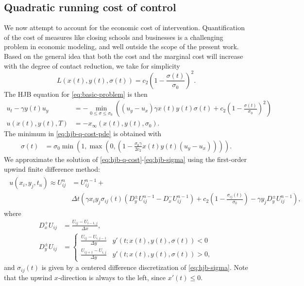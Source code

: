 \documentclass[english,12pt,letter]{article}
\newcommand{\Rnot}{\sigma_0}
\newcommand{\Sinf}{x_\infty}
\newcommand{\Dt}{\Delta t}
\newcommand{\Dx}{\Delta x}
\newcommand{\Dy}{\Delta y}
\begin{document}
\subsection{Quadratic running cost of control}
We now attempt to account for the economic cost of intervention.  Quantification
of the cost of measures like closing schools and businesses is a challenging
problem in economic modeling, and well outside the scope of the present work.
Based on the general idea that both the cost and the marginal cost will increase
with the degree of contact reduction, we take for simplicity
$$
    L(x(t),y(t),\sigma(t)) = c_2 \left(1-\frac{\sigma(t)}{\Rnot}\right)^2.
$$
The HJB equation for \eqref{eq:basic-problem} is then
\begin{subequations} \label{eq:hjb-q-cost}
\begin{align} \label{eq:hjb-q-cost-pde}
    u_t - \gamma y(t) u_y & = - \min_{0\le \sigma\le \Rnot} \left((u_y-u_x)\gamma x(t) y(t) \sigma(t) + c_2 \left(1-\frac{\sigma(t)}{\Rnot}\right)^2 \right) \\
    u(x(t),y(t),T) & = -\Sinf(x(t),y(t),\Rnot).
\end{align}
\end{subequations}
The minimum in \eqref{eq:hjb-q-cost-pde} is obtained with
\begin{align} \label{eq:hjb-sigma}
    \sigma(t) & = \Rnot\min\left(1,\max\left(0,\left(1-\frac{\Rnot\gamma}{2c_2}x(t) y(t) (u_y-u_x)\right)\right)\right).
\end{align}
We approximate the solution of \eqref{eq:hjb-q-cost}-\eqref{eq:hjb-sigma} using the first-order
upwind finite difference method:
\begin{align}
\begin{split}
    u(x_i,y_j,t_n) \approx U^{n}_{ij} & = U^{n-1}_{ij} + \\
    & \Dt \left(\gamma x_i y_j \sigma_{ij}(t) (D^\pm_y U^{n-1}_{ij} - D^-_x U^{n-1}_{ij}) 
        + c_2\left(1-\frac{\sigma_{ij}(t)}{\Rnot}\right) - \gamma y_j D^\pm_y U^{n-1}_{ij}\right),
\end{split}
\end{align}
where
\begin{align*}
    D^+_x U_{ij} & = \frac{U_{ij}-U_{i-1,j}}{\Dx}, \\
    D^\pm_y U_{ij} & =
    \begin{cases}
        \frac{U_{ij}-U_{i,j-1}}{\Dy} & y'(t;x(t),y(t),\sigma(t))<0 \\
        \frac{U_{ij+1}-U_{i,j}}{\Dy} & y'(t;x(t),y(t),\sigma(t))>0,
    \end{cases}
\end{align*}
and $\sigma_{ij}(t)$ is given by a centered difference discretization of \eqref{eq:hjb-sigma}.
Note that the upwind $x$-direction is always to the left, since $x'(t)\le0$.
\end{document}
